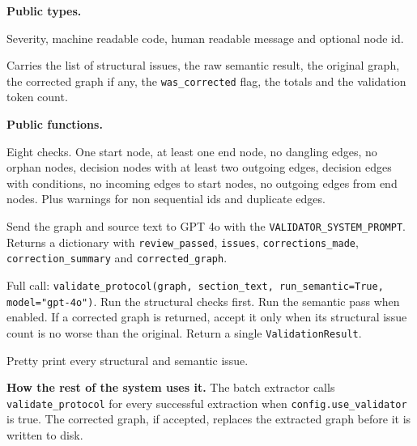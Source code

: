 \documentclass{article}
\begin{document}
\textbf{Public types.}

\begin{description}[leftmargin=2em, style=nextline]
\item[\texttt{StructuralIssue}]
Severity, machine readable code, human readable message and optional
node id.
\item[\texttt{ValidationResult}]
Carries the list of structural issues, the raw semantic result, the
original graph, the corrected graph if any, the
\texttt{was\_corrected} flag, the totals and the validation token
count.
\end{description}

\textbf{Public functions.}

\begin{description}[leftmargin=2em, style=nextline]
\item[\texttt{validate\_structure(graph)}]
Eight checks. One start node, at least one end node, no dangling
edges, no orphan nodes, decision nodes with at least two outgoing
edges, decision edges with conditions, no incoming edges to start
nodes, no outgoing edges from end nodes. Plus warnings for non
sequential ids and duplicate edges.
\item[\texttt{validate\_semantic(graph,\allowbreak{} section\_text,\allowbreak{} model="gpt-4o")}]
Send the graph and source text to GPT 4o with the
\texttt{VALIDATOR\_SYSTEM\_PROMPT}. Returns a dictionary with
\texttt{review\_passed}, \texttt{issues}, \texttt{corrections\_made},
\texttt{correction\_summary} and \texttt{corrected\_graph}.
\item[\texttt{validate\_protocol}]
Full call:
\texttt{validate\_protocol(graph,\allowbreak{} section\_text,\allowbreak{}
run\_semantic=True,\allowbreak{} model="gpt-4o")}.
Run the structural checks first. Run the semantic pass when enabled.
If a corrected graph is returned, accept it only when its structural
issue count is no worse than the original. Return a single
\texttt{ValidationResult}.
\item[\texttt{print\_validation\_summary(result)}]
Pretty print every structural and semantic issue.
\end{description}

\textbf{How the rest of the system uses it.} The batch extractor
calls \texttt{validate\_protocol} for every successful extraction
when \texttt{config.use\_validator} is true. The corrected graph, if
accepted, replaces the extracted graph before it is written to disk.

\end{document}
